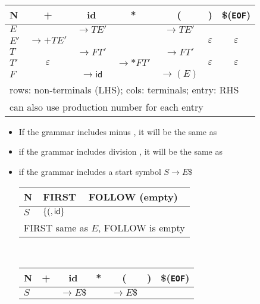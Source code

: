 \begin{enumerate}
\begin{align*}
  \end{align*}
  \begin{tabular}{l|c|c|c|c|c|c}
  \hline
  N       & +          & id  & *          & (           & )   & \$(\texttt{EOF})\\
  \hline
  \(E\)   &            &\(\to TE'\)&      & \(\to TE'\) && \\
  \(E'\)  &\(\to +TE'\)&     &            &  &\(\varepsilon\) &\(\varepsilon\)\\
  \(T\)   &            &\(\to FT'\)    &                &\(\to FT'\) &\\
  \(T'\)  &\(\varepsilon\) & &\(\to *FT'\)&  &\(\varepsilon\)&\(\varepsilon\)\\
  \(F\)   &            &\(\to \mathsf{id}\)& &\(\to (E)\)&&\\
  \hline
  \multicolumn{7}{l}{rows: non-terminals (LHS); cols: terminals; entry: RHS}\\
  \hline
  \multicolumn{7}{l}{can also use production number for each entry}\\
  \hline
  \end{tabular}
\end{enumerate}
\begin{itemize}
\item If the grammar includes minus \mb{-}, it will be the same as \mb{+}
\item if the grammar includes division \mb{$\boldsymbol{\backslash}$}, it will be the same as \mb{*}
\item if the grammar includes a start symbol $S\to E\$$
  \begin{center}
  \begin{tabular}{l|l|l}
    \hline
    N      & \textsf{FIRST} & \textsf{FOLLOW} (empty) \\
    \hline
    \(S\)  & \(\{(,\mathsf{id}\}\) & \\
    \hline
    \multicolumn{3}{l}{FIRST same as $E$, FOLLOW is empty}\\
    \hline
  \end{tabular}\\
  \begin{tabular}{l|c|c|c|c|c|c}
  \hline
  N       & +          & id  & *          & (           & )   & \$(\texttt{EOF})\\
  \hline
  \(S\)   &            &\(\to E\$\)&      & \(\to E\$\) && \\
  \hline
  \end{tabular}
  \end{center}
\end{itemize}
